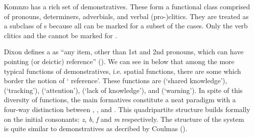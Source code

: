 Komnzo has a rich set of demonstratives. These form a functional class comprised of pronouns, determiners, adverbials, and verbal (pro-)clitics. They are treated as a subclass of s because all can be marked for a subset of the cases. Only the verb clitics and the   cannot be marked for .%

Dixon defines a  as ``any item, other than 1st and 2nd pronouns, which can have pointing (or deictic) reference'' (\citeyear[61-62]{Dixon:2003dj}). We can see in  below that among the more typical functions of demonstratives, i.e. spatial functions, there are some which border the notion of ` reference'. These functions are  (`shared knowledge'),  (`tracking'),  (`attention'),  (`lack of knowledge'), and  (`warning'). In spite of this diversity of functions, the main formatives constitute a neat paradigm with a four-way distinction between , ,  and . This quadripartite structure builds formally on the initial consonants: \emph{z}, \emph{b}, \emph{f} and \emph{m} respectively. The structure of the system is quite similar to  demonstratives as decribed by Coulmas (\citeyear{Coulmas:1982wl}).%

